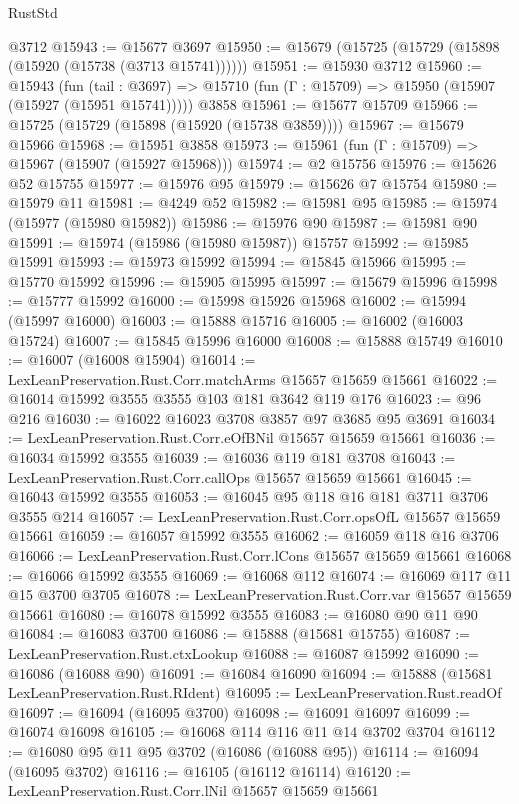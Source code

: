 \begin{lexlean}{RustStd}
\begin{coremodule}
{\begin{coremodule}
{{{{{{{{{{{{{{{{{{{{{{{{{{{{{{{{{{{{{{{{{{{{{{{    @3712
@15943 := @15677 @3697
@15950 := @15679 (@15725 (@15729 (@15898 (@15920 (@15738 (@3713 @15741))))))
@15951 := @15930 @3712
@15960 := @15943
    (fun (tail : @3697) => @15710 (fun (Γ : @15709) => @15950 (@15907 (@15927 (@15951 @15741)))))
    @3858
@15961 := @15677 @15709
@15966 := @15725 (@15729 (@15898 (@15920 (@15738 @3859))))
@15967 := @15679 @15966
@15968 := @15951 @3858
@15973 := @15961 (fun (Γ : @15709) => @15967 (@15907 (@15927 @15968)))
@15974 := @2 @15756
@15976 := @15626 @52 @15755
@15977 := @15976 @95
@15979 := @15626 @7 @15754
@15980 := @15979 @11
@15981 := @4249 @52
@15982 := @15981 @95
@15985 := @15974 (@15977 (@15980 @15982))
@15986 := @15976 @90
@15987 := @15981 @90
@15991 := @15974 (@15986 (@15980 @15987)) @15757
@15992 := @15985 @15991
@15993 := @15973 @15992
@15994 := @15845 @15966
@15995 := @15770 @15992
@15996 := @15905 @15995
@15997 := @15679 @15996
@15998 := @15777 @15992
@16000 := @15998 @15926 @15968
@16002 := @15994 (@15997 @16000)
@16003 := @15888 @15716
@16005 := @16002 (@16003 @15724)
@16007 := @15845 @15996 @16000
@16008 := @15888 @15749
@16010 := @16007 (@16008 @15904)
@16014 := LexLeanPreservation.Rust.Corr.matchArms @15657 @15659 @15661
@16022 := @16014 @15992 @3555 @3555 @103 @181 @3642 @119 @176
@16023 := @96 @216
@16030 := @16022 @16023 @3708 @3857 @97 @3685 @95 @3691
@16034 := LexLeanPreservation.Rust.Corr.eOfBNil @15657 @15659 @15661
@16036 := @16034 @15992 @3555
@16039 := @16036 @119 @181 @3708
@16043 := LexLeanPreservation.Rust.Corr.callOps @15657 @15659 @15661
@16045 := @16043 @15992 @3555
@16053 := @16045 @95 @118 @16 @181 @3711 @3706 @3555 @214
@16057 := LexLeanPreservation.Rust.Corr.opsOfL @15657 @15659 @15661
@16059 := @16057 @15992 @3555
@16062 := @16059 @118 @16 @3706
@16066 := LexLeanPreservation.Rust.Corr.lCons @15657 @15659 @15661
@16068 := @16066 @15992 @3555
@16069 := @16068 @112
@16074 := @16069 @117 @11 @15 @3700 @3705
@16078 := LexLeanPreservation.Rust.Corr.var @15657 @15659 @15661
@16080 := @16078 @15992 @3555
@16083 := @16080 @90 @11 @90
@16084 := @16083 @3700
@16086 := @15888 (@15681 @15755)
@16087 := LexLeanPreservation.Rust.ctxLookup
@16088 := @16087 @15992
@16090 := @16086 (@16088 @90)
@16091 := @16084 @16090
@16094 := @15888 (@15681 LexLeanPreservation.Rust.RIdent)
@16095 := LexLeanPreservation.Rust.readOf
@16097 := @16094 (@16095 @3700)
@16098 := @16091 @16097
@16099 := @16074 @16098
@16105 := @16068 @114 @116 @11 @14 @3702 @3704
@16112 := @16080 @95 @11 @95 @3702 (@16086 (@16088 @95))
@16114 := @16094 (@16095 @3702)
@16116 := @16105 (@16112 @16114)
@16120 := LexLeanPreservation.Rust.Corr.lNil @15657 @15659 @15661
}}}}}}}}}}}}}}}}}}}}}}}}}}}}}}}}}}}}}}}}}}}}}}}
\end{coremodule}}
\end{coremodule}
\end{lexlean}
